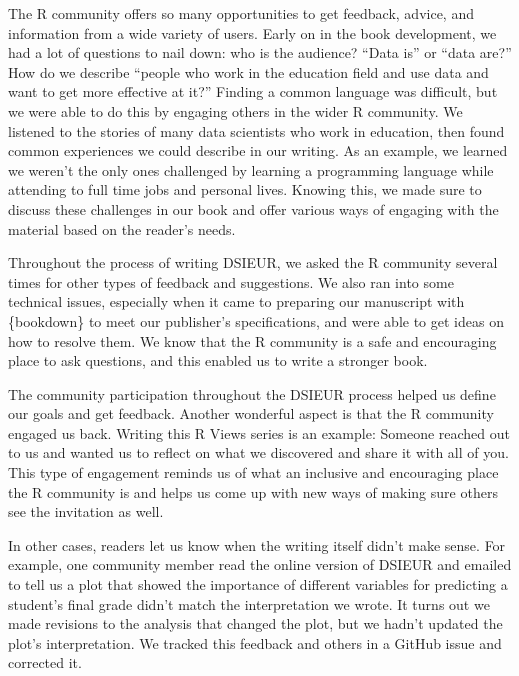 \documentclass[
  english,
  man]{apa6}
\begin{document}
The R community offers so many opportunities to get feedback, advice, and information from a wide variety of users. Early on in the book development, we had a lot of questions to nail down: who is the audience? ``Data is'' or ``data are?'' How do we describe ``people who work in the education field and use data and want to get more effective at it?'' Finding a common language was difficult, but we were able to do this by engaging others in the wider R community. We listened to the stories of many data scientists who work in education, then found common experiences we could describe in our writing. As an example, we learned we weren't the only ones challenged by learning a programming language while attending to full time jobs and personal lives. Knowing this, we made sure to discuss these challenges in our book and offer various ways of engaging with the material based on the reader's needs.

Throughout the process of writing DSIEUR, we asked the R community several times for other types of feedback and suggestions. We also ran into some technical issues, especially when it came to preparing our manuscript with \{bookdown\} to meet our publisher's specifications, and were able to get ideas on how to resolve them. We know that the R community is a safe and encouraging place to ask questions, and this enabled us to write a stronger book.

The community participation throughout the DSIEUR process helped us define our goals and get feedback. Another wonderful aspect is that the R community engaged us back. Writing this R Views series is an example: Someone reached out to us and wanted us to reflect on what we discovered and share it with all of you. This type of engagement reminds us of what an inclusive and encouraging place the R community is and helps us come up with new ways of making sure others see the invitation as well.

In other cases, readers let us know when the writing itself didn't make sense. For example, one community member read the online version of DSIEUR and emailed to tell us a plot that showed the importance of different variables for predicting a student's final grade didn't match the interpretation we wrote. It turns out we made revisions to the analysis that changed the plot, but we hadn't updated the plot's interpretation. We tracked this feedback and others in a GitHub issue and corrected it.
\end{document}
